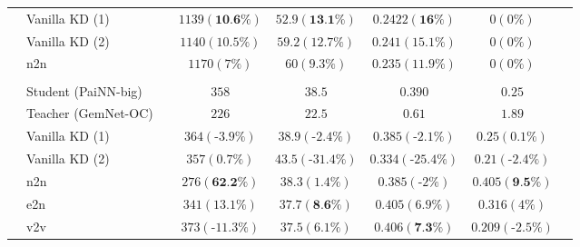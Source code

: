 \documentclass{article}
\begin{document}
\begin{table}[H]
\begin{tabular}{llcccccc}
& Vanilla KD (1)             &   &            $1139 (\textbf{10.6\%})$          &          $52.9 (\textbf{13.1\%})$     &     $0.2422 (\textbf{16\%})$        &  $0 (0\%)$ \\
& Vanilla KD (2)               &   &            $1140 (10.5\%)$          &          $59.2 (12.7\%)$     &     $0.241 (15.1\%)$        &  $0 (0\%)$ &  \\
& n2n              &   &            $1170 (7\%)$          &          $60 (9.3\%)$     &     $0.235 (11.9\%)$        &  $0 (0\%)$  &  \\
\multicolumn{7}{c}{} \\
\parbox[t]{2mm}{} & Student (PaiNN-big)              &  &          $358$        &   $38.5$     &   $0.390$      &   $0.25$  \\
& Teacher (GemNet-OC)                      &   &              $226$        &   $22.5$     &   $0.61$      &   $1.89$     \\
& Vanilla KD (1)           &   &            $364 (\text{-}3.9\%)$          &          $38.9 (\text{-}2.4\%)$     &     $0.385 (\text{-}2.1\%)$        &  $0.25 (0.1\%)$    \\
& Vanilla KD (2)             &   &            $357 (0.7\%)$          &          $43.5 (\text{-}31.4\%)$     &     $0.334 (\text{-}25.4\%)$        &  $0.21 (\text{-}2.4\%)$   \\
& n2n              &   &            $276 (\textbf{62.2\%})$          &          $38.3 (1.4\%)$     &     $0.385 (\text{-}2\%)$        &  $0.405 (\textbf{9.5\%})$   \\
& e2n               &   &            $341 (13.1\%)$          &          $37.7 (\textbf{8.6\%})$     &     $0.405 (6.9\%)$        &  $0.316 (4\%)$     \\
& v2v              &   &            $373 (\text{-}11.3\%)$          &          $37.5 (6.1\%)$     &     $0.406 (\textbf{7.3\%})$        &  $0.209 (\text{-}2.5\%)$        
\end{tabular}
\label{tab:val-id}
\end{table}
\end{document}
